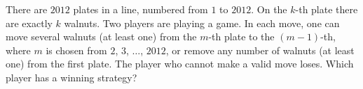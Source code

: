 \problem{}
There are $2012$ plates in a line, numbered from $1$ to $2012$.
On the $k$-th plate there are exactly $k$ walnuts.
Two players are playing a game.
In each move, one can move several walnuts (at least one) from the $m$-th plate to the
$(m-1)$-th, where $m$ is chosen from $2$, $3$, $\ldots$, $2012$, or remove any number
of walnuts (at least one) from the first plate.
The player who cannot make a valid move loses.
Which player has a winning strategy?
\solution
\endproblem
